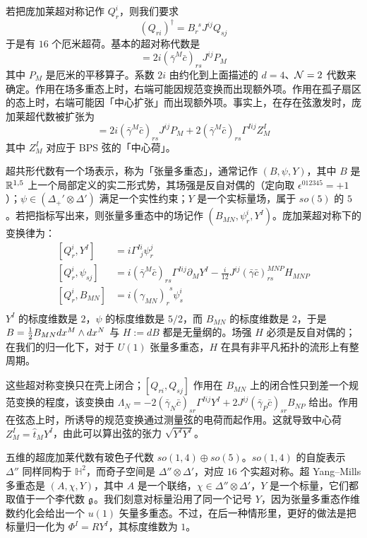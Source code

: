若把庞加莱超对称记作 $Q_{r}^i$，则我们要求
%
\begin{equation}
(Q_{r i})^\dagger = B_r^{~~s} J^{ij} Q_{s j}
\end{equation}
%
于是有 $16$ 个厄米超荷。基本的超对称代数是
%
\begin{equation}
[Q_{r}^i, Q_{s}^j ] =  2i  (\bar\gamma^M\bar c)_{rs} J^{ij} P_M
\end{equation}
%
其中 $P_M$ 是厄米的平移算子。系数 $2i$ 由约化到上面描述的 $d=4$、$\mathcal{N}=2$ 代数来确定。作用在场多重态上时，右端可能因规范变换而出现额外项。作用在孤子扇区的态上时，右端可能因「中心扩张」而出现额外项。事实上，在存在弦激发时，庞加莱超代数被扩张为
%
\begin{equation}
[Q_{ri}, Q_{sj} ] =  2i  (\bar\gamma^M\bar c)_{rs} J^{ij} P_M +2  (\bar\gamma^M\bar c)_{rs} \Gamma^{I ij} Z_M^I
\end{equation}
%
其中 $Z_M^I$ 对应于 BPS 弦的「中心荷」。

超共形代数有一个场表示，称为「张量多重态」，通常记作 $(B, \psi, Y)$，其中 $B$ 是 $\mathbb{R}^{1,5}$ 上一个局部定义的实二形式势，其场强是反自对偶的（定向取 $\epsilon^{012345}=+1$）；$\psi \in (\Delta_+'\otimes \Delta')$ 满足一个实性约束；$Y$ 是一个实标量场，属于 $so(5)$ 的 $5$ \cite{Howe:1983fr}。若把指标写出来，则张量多重态中的场记作 $(B_{MN}, \psi_{r}^i, Y^I)$。庞加莱超对称下的变换律为：
%
\begin{equation}
\begin{split}
[Q_{r}^i, Y^I] &=   i \Gamma^{Ii}_{~~ j} \psi_{r}^j \\
[Q_{r}^i, \psi_{sj} ]  & =   i (\bar \gamma^M\bar c)_{rs} \Gamma^{Iij} \partial_M Y^I  - \frac{i}{12} J^{ij} (\bar\gamma\bar c)^{MNP}_{rs} H_{MNP} \\
[Q_{r}^i, B_{MN} ] & =  i (\gamma_{MN})_r^{~~s} \psi_{s}^{i} \\
\end{split}
\end{equation}
%
$Y^I$ 的标度维数是 $2$，$\psi$ 的标度维数是 $5/2$，而 $B_{MN}$ 的标度维数是 $2$，于是 $B = \tfrac{1}{2} B_{MN} dx^M \wedge dx^N$ 与 $H:=dB$ 都是无量纲的。场强 $H$ 必须是反自对偶的；在我们的归一化下，对于 $U(1)$ 张量多重态，$H$ 在具有非平凡拓扑的流形上有整周期。

这些超对称变换只在壳上闭合；$[Q_{ri}, Q_{sj} ]$ 作用在 $B_{MN}$ 上的闭合性只到差一个规范变换的程度，该变换由 $\Lambda_N = -2 (\bar \gamma_N\bar c)_{sr} \Gamma^{Iij} Y^I + 2 J^{ij} (\bar \gamma_P\bar c)_{sr}B_{NP}$ 给出。作用在弦态上时，所诱导的规范变换通过测量弦的电荷而起作用。这就导致中心荷 $Z_{M}^I= \hat t_M Y^I$，由此可以算出弦的张力 $\sqrt{Y^I Y^I}$。

五维的超庞加莱代数有玻色子代数 $so(1,4) \oplus so(5)$。$so(1,4)$ 的自旋表示 $\Delta''$ 同样同构于 $\mathbb{H}^2$，而奇子空间是 $\Delta''\otimes \Delta'$，对应 $16$ 个实超对称。超 Yang--Mills 多重态是 $(A,\chi,Y)$，其中 $A$ 是一个联络，$\chi \in \Delta''\otimes \Delta'$，$Y$ 是一个标量，它们都取值于一个李代数 $\mathfrak{g}$。我们刻意对标量沿用了同一个记号 $Y$，因为张量多重态作维数约化会给出一个 $u(1)$ 矢量多重态。不过，在后一种情形里，更好的做法是把标量归一化为 $\Phi^I = R Y^I$，其标度维数为 $1$。
